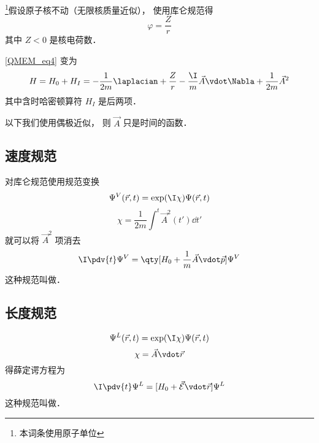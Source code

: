 
\footnote{本词条使用原子单位}假设原子核不动（无限核质量近似）， 使用库仑规范得
\begin{equation}
\varphi = \frac{Z}{r}
\end{equation}
其中 $Z < 0$ 是核电荷数．

\autoref{QMEM_eq4} 变为
\begin{equation}
H = H_0 + H_I = -\frac{1}{2m} \laplacian +  \frac{Z}{r} - \frac{\I}{m} \vec A \vdot \Nabla + \frac{1}{2m} \vec A^2
\end{equation}
其中含时哈密顿算符 $H_I$ 是后两项．

以下我们使用偶极近似， 则 $\vec A$ 只是时间的函数．

\subsection{速度规范}
 对库仑规范使用规范变换
\begin{equation}
\Psi^V(\vec r, t) =  \exp(\I \chi) \Psi(\vec r, t)
\end{equation}
\begin{equation}
\chi = \frac{1}{2m} \int^t \vec A^2(t') \dd{t'}
\end{equation}
就可以将 $\vec A^2$ 项消去
\begin{equation}
\I \pdv{t} \Psi^V = \qty[H_0 + \frac{1}{m} \vec A \vdot \vec p] \Psi^V
\end{equation}
这种规范叫做．

\subsection{长度规范}

\begin{equation}
\Psi^L(\vec r, t) =  \exp(\I \chi) \Psi(\vec r, t)
\end{equation}
\begin{equation}
\chi = \vec A \vdot \vec r
\end{equation}
得薛定谔方程为
\begin{equation}
\I \pdv{t} \Psi^L = [H_0 + \vec{\mathcal{E}} \vdot \vec r] \Psi^L
\end{equation}
这种规范叫做．
